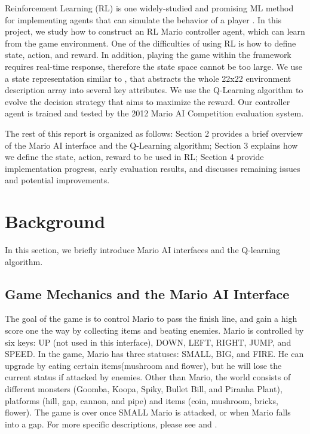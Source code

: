 Reinforcement Learning (RL) \cite{sutton1998reinforcement} is one widely-studied and promising ML method for implementing agents that can simulate the behavior of a player \cite{tsay2011evolving}. In this project, we study how to construct an RL Mario controller agent, which can learn from the game environment. One of the difficulties of using RL is how to define state, action, and reward. In addition, playing the game within the framework requires real-time response, therefore the state space cannot be too large. We use a state representation similar to \cite{tsay2011evolving}, that abstracts the whole 22x22 environment description array into several key attributes. We use the Q-Learning algorithm to evolve the decision strategy that aims to maximize the reward. Our controller agent is trained and tested by the 2012 Mario AI Competition evaluation system. 

The rest of this report is organized as follows: Section 2 provides a brief overview of the Mario AI interface and the Q-Learning algorithm; Section 3 explains how we define the state, action, reward to be used in RL; Section 4 provide implementation progress, early evaluation results, and discusses remaining issues and potential improvements.

\section{Background}
In this section, we briefly introduce Mario AI interfaces and the Q-learning algorithm.

\subsection{Game Mechanics and the Mario AI Interface}
The goal of the game is to control Mario to pass the finish line, and gain a high score one the way by collecting items and beating enemies. Mario is controlled by six keys: UP (not used in this interface), DOWN, LEFT, RIGHT, JUMP, and SPEED. In the game, Mario has three statuses: SMALL, BIG, and FIRE. He can upgrade by eating certain items(mushroom and flower), but he will lose the current status if attacked by enemies. Other than Mario, the world consists of different monsters (Goomba, Koopa, Spiky, Bullet Bill, and Piranha Plant), platforms (hill, gap, cannon, and pipe) and items (coin, mushroom, bricks, flower). The game is over once SMALL Mario is attacked, or when Mario falls into a gap. For more specific descriptions, please see \cite{tsay2011evolving} and \cite{togelius20102009}.

